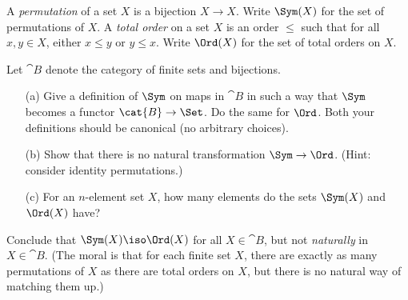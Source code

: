 \begin{exercise}
A \emph{permutation} of a set $X$ is a bijection $X \to X$.
Write $\Sym(X)$ for the set of permutations of $X$.
A \emph{total order} on a set $X$ is an order $\leq$ such that for all $x, y \in X$,
either $x \leq y$ or $y \leq x$.
Write $\Ord(X)$ for the set of total orders on $X$.

Let $\cat{B}$ denote the category of finite sets and bijections.

        \begin{itemize}
        \item[(a)]
Give a definition of $\Sym$ on maps in $\cat{B}$ in such a way that $\Sym$
becomes a functor $\cat{B} \to \Set$.  Do the same for $\Ord$.  Both your
definitions should be canonical (no arbitrary choices).

        \item[(b)]
Show that there is no natural transformation $\Sym \to \Ord$.
(Hint: consider identity permutations.)

        \item[(c)]
For an $n$-element set $X$, how many elements do the sets $\Sym(X)$
and $\Ord(X)$ have?
        \end{itemize}

Conclude that $\Sym(X) \iso \Ord(X)$ for all $X \in \cat{B}$, but not
\emph{naturally} in $X \in \cat{B}$.  (The moral is that for each finite
set $X$, there are exactly as many permutations of $X$ as there are total
orders on $X$, but there is no natural way of matching them up.)
\end{exercise}

